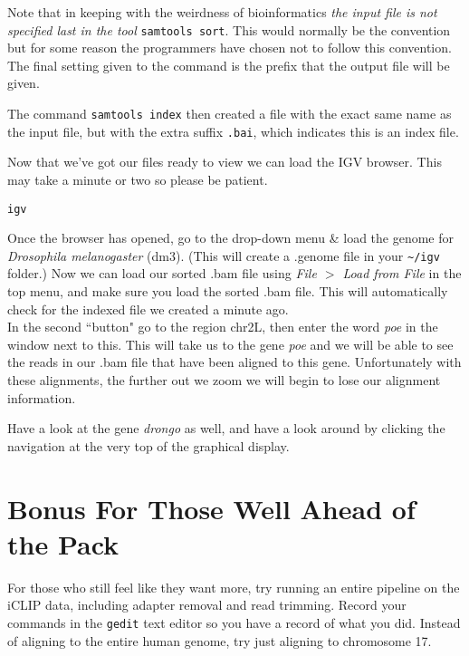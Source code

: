 \begin{information}
Note that in keeping with the weirdness of bioinformatics \textit{the input file is not specified last in the tool} \texttt{samtools sort}.
This would normally be the convention but for some reason the programmers have chosen not to follow this convention.
The final setting given to the command is the prefix that the output file will be given. \\
\end{information}

The command \texttt{samtools index} then created a file with the exact same name as the input file, but with the extra suffix \texttt{.bai}, which indicates this is an index file.\\

\begin{steps}
Now that we've got our files ready to view we can load the IGV browser.
This may take a minute or two so please be patient.

\begin{lstlisting}
igv
\end{lstlisting}
\end{steps}

\begin{steps}
Once the browser has opened, go to the drop-down menu \& load the genome for \textit{Drosophila melanogaster} (dm3).
(This will create a .genome file in your \texttt{\~{}/igv} folder.)
Now we can load our sorted .bam file using  \textit{File $>$ Load from File} in the top menu, and make sure you load the sorted .bam file.
This will automatically check for the indexed file we created a minute ago. \\

In the second ``button" go to the region chr2L, then enter the word \textit{poe} in the window next to this.
This will take us to the gene \textit{poe} and we will be able to see the reads in our .bam file that have been aligned to this gene.
Unfortunately with these alignments, the further out we zoom we will begin to lose our alignment information.

Have a look at the gene \textit{drongo} as well, and have a look around by clicking the navigation at the very top of the graphical display.
\end{steps}

\section{Bonus For Those Well Ahead of the Pack}
\begin{advanced}
For those who still feel like they want more, try running an entire pipeline on the iCLIP data, including adapter removal and read trimming.
Record your commands in the \texttt{gedit} text editor so you have a record of what you did.
Instead of aligning to the entire human genome, try just aligning to chromosome 17.
\end{advanced}



